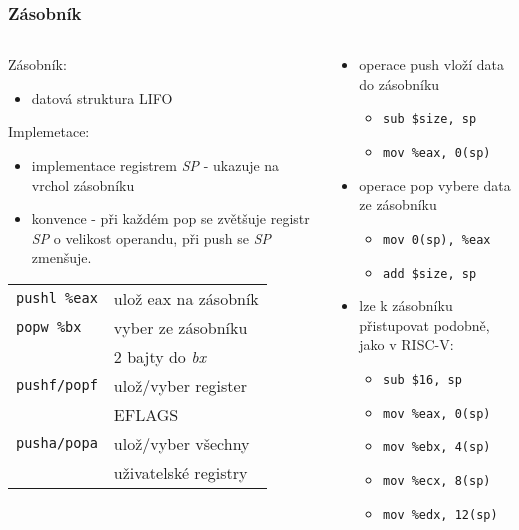 \documentclass{beamer}
\begin{document}
\begin{frame}
\frametitle{Zásobník}

\begin{columns}
\begin{column}{0.45\textwidth}
\small
Zásobník:
\begin{itemize}
\item datová struktura LIFO
\end{itemize}

Implemetace:
\begin{itemize}
\item implementace registrem \textit{SP} - ukazuje na vrchol zásobníku
\item konvence - při každém pop se zvětšuje registr \textit{SP} o velikost operandu, při push se \textit{SP} zmenšuje.
\end{itemize}
\begin{tabular}{ l l}
\texttt{pushl \%eax} &  ulož eax na zásobník\\
\texttt{popw \%bx}   &  vyber ze zásobníku \\
                     &  2 bajty do \textit{bx}\\
\texttt{pushf/popf}  &  ulož/vyber register\\
                     &  EFLAGS\\
\texttt{pusha/popa}  &  ulož/vyber všechny\\
                     &  uživatelské registry\\
\end{tabular}
\end{column}

\begin{column}{0.55\textwidth}  
\small
\begin{itemize}
\item operace push vloží data do zásobníku
\begin{itemize}
\item \texttt{sub \$size, sp}
\item \texttt{mov \%eax, 0(sp)}
\end{itemize}
\item operace pop vybere data ze zásobníku
\begin{itemize}
\item \texttt{mov 0(sp), \%eax}
\item \texttt{add \$size, sp}
\end{itemize}
\item lze k zásobníku přistupovat podobně, jako v RISC-V:
\begin{itemize}
\item \texttt{sub \$16, sp}
\item \texttt{mov \%eax, 0(sp)}
\item \texttt{mov \%ebx, 4(sp)}
\item \texttt{mov \%ecx, 8(sp)}
\item \texttt{mov \%edx, 12(sp)}
\end{itemize}
\end{itemize}
\end{column}
\end{columns}
\end{frame}
\end{document}
